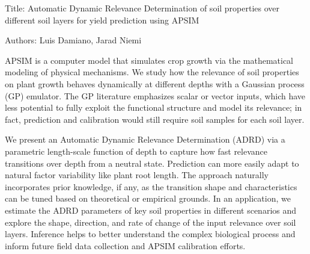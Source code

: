 %
%
% 
% 
% 
% 
% 
% 
%
% 
%
%
%   
%
%
%
% 
%
%
%
%
%

Title: Automatic Dynamic Relevance Determination of soil properties
over different soil layers for yield prediction using APSIM

Authors: Luis Damiano, Jarad Niemi


APSIM is a computer model that simulates crop growth via the
mathematical modeling of physical mechanisms. We study how the
relevance of soil properties on plant growth behaves dynamically at
different depths with a Gaussian process (GP) emulator. The GP
literature emphasizes scalar or vector inputs, which have less
potential to fully exploit the functional structure and model its
relevance; in fact, prediction and calibration would still require
soil samples for each soil layer.

We present an Automatic Dynamic Relevance Determination (ADRD) via a
parametric length-scale function of depth to capture how fast
relevance transitions over depth from a neutral state.  Prediction
can more easily adapt to natural factor variability like plant root
length. The approach naturally incorporates prior knowledge, if any,
as the transition shape and characteristics can be tuned based on
theoretical or empirical grounds. In an application, we estimate the
ADRD parameters of key soil properties in different scenarios and
explore the shape, direction, and rate of change of the input
relevance over soil layers. Inference helps to better understand the
complex biological process and inform future field data collection and
APSIM calibration efforts.

